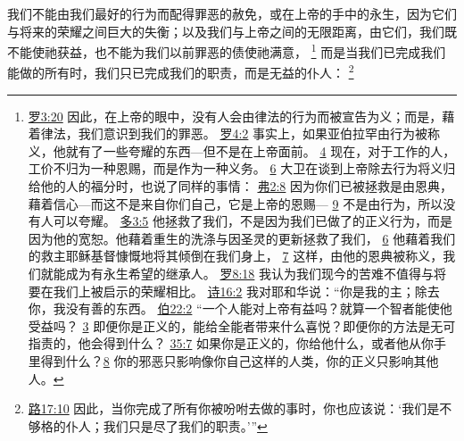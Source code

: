 \documentclass[12pt, a4paper, oneside]{ctexart}
\newcounter{parnum}[section]
\newcommand{\N}{%
   \noindent\refstepcounter{parnum}%
    \makebox[\parindent][l]{\textbf{\arabic{parnum}.}}}
\begin{document}
\N 我们不能由我们最好的行为而配得罪恶的赦免，或在上帝的手中的永生，因为它们与将来的荣耀之间巨大的失衡；以及我们与上帝之间的无限距离，由它们，我们既不能使祂获益，也不能为我们以前罪恶的债使祂满意，
	\footnote {
		\href{https://biblehub.com/romans/3-20.htm}{罗3:20} 因此，在上帝的眼中，没有人会由律法的行为而被宣告为义；而是，藉着律法，我们意识到我们的罪恶。
		\href{https://biblehub.com/romans/4-2.htm}{罗4:2} 事实上，如果亚伯拉罕由行为被称义，他就有了一些夸耀的东西---但不是在上帝面前。
		\href{https://biblehub.com/romans/4-4.htm}{4} 现在，对于工作的人，工价不归为一种恩赐，而是作为一种义务。
		\href{https://biblehub.com/romans/4-6.htm}{6} 大卫在谈到上帝除去行为将义归给他的人的福分时，也说了同样的事情：
		\href{https://biblehub.com/ephesians/2-8.htm}{弗2:8} 因为你们已被拯救是由恩典，藉着信心---而这不是来自你们自己，它是上帝的恩赐---
		\href{https://biblehub.com/ephesians/2-9.htm}{9} 不是由行为，所以没有人可以夸耀。
		\href{https://biblehub.com/titus/3-5.htm}{多3:5} 他拯救了我们，不是因为我们已做了的正义行为，而是因为他的宽恕。他藉着重生的洗涤与因圣灵的更新拯救了我们，
		\href{https://biblehub.com/titus/3-6.htm}{6} 他藉着我们的救主耶稣基督慷慨地将其倾倒在我们身上，
		\href{https://biblehub.com/titus/3-7.htm}{7} 这样，由他的恩典被称义，我们就能成为有永生希望的继承人。
		\href{https://biblehub.com/romans/8-18.htm}{罗8:18} 我认为我们现今的苦难不值得与将要在我们上被启示的荣耀相比。
		\href{https://biblehub.com/psalms/16-2.htm}{诗16:2} 我对耶和华说：“你是我的主；除去你，我没有善的东西。
		\href{https://biblehub.com/job/22-2.htm}{伯22:2} “一个人能对上帝有益吗？就算一个智者能使他受益吗？
		\href{https://biblehub.com/job/22-3.htm}{3} 即便你是正义的，能给全能者带来什么喜悦？即便你的方法是无可指责的，他会得到什么？
		\href{https://biblehub.com/job/35-7.htm}{35:7} 如果你是正义的，你给他什么，或者他从你手里得到什么？\href{https://biblehub.com/job/35-8.htm}{8} 你的邪恶只影响像你自己这样的人类，你的正义只影响其他人。
	}
	而是当我们已完成我们能做的所有时，我们只已完成我们的职责，而是无益的仆人：
	\footnote {
		\href{https://biblehub.com/luke/17-10.htm}{路17:10} 因此，当你完成了所有你被吩咐去做的事时，你也应该说：‘我们是不够格的仆人；我们只是尽了我们的职责。’”
	}
\end{document}
